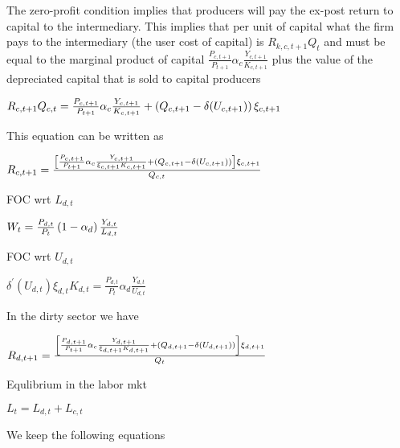 \documentclass{article}
\begin{document}
The zero-profit condition implies that producers will pay the ex-post return
to capital to the intermediary. This implies that per unit of capital what
the firm pays to the intermediary (the user cost of capital) is $%
R_{k,c,t+1}Q_{t}$ and must be equal to the marginal product of capital $%
\frac{P_{c,t+1}}{P_{t+1}}\alpha _{c}\frac{Y_{c,t+1}}{K_{c,t+1}}$ plus the
value of the depreciated capital that is sold to capital producers

$R_{c,t+1}Q_{c,t}=\frac{P_{c,t+1}}{P_{t+1}}\alpha _{c}\frac{Y_{c,t+1}}{%
K_{c,t+1}}+\left( Q_{c,t+1}-\delta (U_{c,t+1})\right) \xi _{c,t+1}$

This equation can be written as

$R_{c,t+1}=\frac{\left[ \frac{P_{c,t+1}}{P_{t+1}}\alpha _{c}\frac{Y_{c,t+1}}{%
\xi _{c,t+1}K_{c,t+1}}+\left( Q_{c,t+1}-\delta (U_{c,t+1})\right) \right]
\xi _{c,t+1}}{Q_{c,t}}$

FOC wrt $L_{d,t}$

$W_{t}=\frac{P_{d,t}}{P_{t}}\left( 1-\alpha _{d}\right) \frac{Y_{d,t}}{%
L_{d,t}}$

FOC wrt $U_{d,t}$

$\delta ^{\prime }(U_{d,t})\xi _{d,t}K_{d,t}=\frac{P_{d,t}}{P_{t}}\alpha _{d}%
\frac{Y_{d,t}}{U_{d,t}}$

In the dirty sector we have

$R_{d,t+1}=\frac{\left[ \frac{P_{d,t+1}}{P_{t+1}}\alpha _{c}\frac{Y_{d,t+1}}{%
\xi _{d,t+1}K_{d,t+1}}+\left( Q_{d,t+1}-\delta (U_{d,t+1})\right) \right]
\xi _{d,t+1}}{Q_{t}}$

Equlibrium in the labor mkt

$L_{t}=L_{d,t}+L_{c,t}$

\bigskip

We keep the following equations
\end{document}
